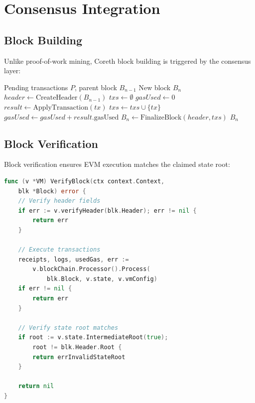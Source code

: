 \documentclass[11pt,letterpaper]{article}
\begin{document}
\section{Consensus Integration}

\subsection{Block Building}

Unlike proof-of-work mining, Coreth block building is triggered by the consensus layer:

\begin{algorithm}
\caption{Consensus-Triggered Block Building}
\label{alg:blockbuild}
\begin{algorithmic}[1]
\Require Pending transactions $P$, parent block $B_{n-1}$
\Ensure New block $B_n$
\State $header \gets \text{CreateHeader}(B_{n-1})$
\State $txs \gets \emptyset$
\State $gasUsed \gets 0$
        \State $result \gets \text{ApplyTransaction}(tx)$
            \State $txs \gets txs \cup \{tx\}$
            \State $gasUsed \gets gasUsed + result.\text{gasUsed}$
        \EndIf
    \EndIf
\EndFor
\State $B_n \gets \text{FinalizeBlock}(header, txs)$
\State \Return $B_n$
\end{algorithmic}
\end{algorithm}

\subsection{Block Verification}

Block verification ensures EVM execution matches the claimed state root:

\begin{lstlisting}[language=Go, caption=Block Verification]
func (v *VM) VerifyBlock(ctx context.Context,
    blk *Block) error {
    // Verify header fields
    if err := v.verifyHeader(blk.Header); err != nil {
        return err
    }

    // Execute transactions
    receipts, logs, usedGas, err :=
        v.blockChain.Processor().Process(
            blk.Block, v.state, v.vmConfig)
    if err != nil {
        return err
    }

    // Verify state root matches
    if root := v.state.IntermediateRoot(true);
        root != blk.Header.Root {
        return errInvalidStateRoot
    }

    return nil
}
\end{lstlisting}
\end{document}
